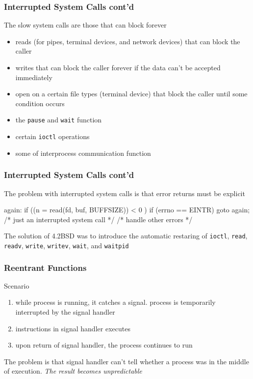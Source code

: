 \documentclass[newPxFont,sthlmFooter,nooffset]{beamer}
\begin{document}
\begin{frame}[t]
  \frametitle{Interrupted System Calls cont'd}
The slow system calls are those that can block forever
\begin{itemize}
\item reads (for pipes, terminal devices, and network devices) that can block the caller
\item writes that can block the caller forever if the data can't be accepted immediately
\item open on a certain file types (terminal device) that block the caller until some condition occurs
\item the \texttt{pause} and \texttt{wait} function
\item certain \texttt{ioctl} operations
\item some of interprocess communication function
\end{itemize}

\end{frame}

\begin{frame}[fragile,t]
  \frametitle{Interrupted System Calls cont'd}
The problem with interrupted system calls is that error returns must be explicit

\begin{codedef}
again:
    if ((n = read(fd, buf, BUFFSIZE)) < 0 ) {
        if (errno == EINTR)
            goto again; /* just an interrupted system call */
        /* handle other errors */
    }
\end{codedef}

The solution of 4.2BSD was to introduce the automatic restaring of \texttt{ioctl}, \texttt{read}, \texttt{readv}, \texttt{write}, \texttt{writev}, \texttt{wait}, and \texttt{waitpid}

\end{frame}



\begin{frame}[fragile,t]
  \frametitle{Reentrant Functions}

Scenario
\begin{enumerate}
\item <1-> while process is running, it catches a signal. process is temporarily interrupted by the signal handler
\item <2-> instructions in signal handler executes
\item <3-> upon return of signal handler, the process continues to run
\end{enumerate}

 {The problem is that signal handler can't tell whether a process was in the middle of execution. \textit{The result becomes unpredictable}}
\end{frame}
\end{document}
